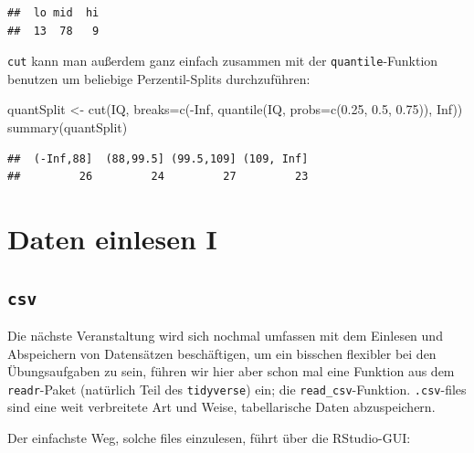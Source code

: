\documentclass[
]{book}
\newenvironment{Shaded}{\begin{snugshade}}{\end{snugshade}}
\newcommand{\AttributeTok}[1]{\textcolor[rgb]{0.77,0.63,0.00}{#1}}
\newcommand{\ConstantTok}[1]{\textcolor[rgb]{0.00,0.00,0.00}{#1}}
\newcommand{\FloatTok}[1]{\textcolor[rgb]{0.00,0.00,0.81}{#1}}
\newcommand{\FunctionTok}[1]{\textcolor[rgb]{0.00,0.00,0.00}{#1}}
\newcommand{\NormalTok}[1]{#1}
\newcommand{\OtherTok}[1]{\textcolor[rgb]{0.56,0.35,0.01}{#1}}
\newcommand{\SpecialCharTok}[1]{\textcolor[rgb]{0.00,0.00,0.00}{#1}}
\begin{document}
\begin{verbatim}
##  lo mid  hi 
##  13  78   9
\end{verbatim}

\texttt{cut} kann man außerdem ganz einfach zusammen mit der \texttt{quantile}-Funktion benutzen um beliebige Perzentil-Splits durchzuführen:

\begin{Shaded}
\begin{Highlighting}[]
\NormalTok{quantSplit }\OtherTok{\textless{}{-}} \FunctionTok{cut}\NormalTok{(IQ,}
                  \AttributeTok{breaks=}\FunctionTok{c}\NormalTok{(}\SpecialCharTok{{-}}\ConstantTok{Inf}\NormalTok{, }
                           \FunctionTok{quantile}\NormalTok{(IQ, }
                                    \AttributeTok{probs=}\FunctionTok{c}\NormalTok{(}\FloatTok{0.25}\NormalTok{,}
                                            \FloatTok{0.5}\NormalTok{, }
                                            \FloatTok{0.75}\NormalTok{)), }
                           \ConstantTok{Inf}\NormalTok{))}
\FunctionTok{summary}\NormalTok{(quantSplit)}
\end{Highlighting}
\end{Shaded}

\begin{verbatim}
##  (-Inf,88]  (88,99.5] (99.5,109] (109, Inf] 
##         26         24         27         23
\end{verbatim}

\hypertarget{daten-einlesen-i}{%
\section{Daten einlesen I}\label{daten-einlesen-i}}

\hypertarget{csv}{%
\subsection{\texorpdfstring{\texttt{csv}}{csv}}\label{csv}}

Die nächste Veranstaltung wird sich nochmal umfassen mit dem Einlesen und Abspeichern von Datensätzen beschäftigen, um ein bisschen flexibler bei den Übungsaufgaben zu sein, führen wir hier aber schon mal eine Funktion aus dem \texttt{readr}-Paket (natürlich Teil des \texttt{tidyverse}) ein; die \texttt{read\_csv}-Funktion. \texttt{.csv}-files sind eine weit verbreitete Art und Weise, tabellarische Daten abzuspeichern.

Der einfachste Weg, solche files einzulesen, führt über die RStudio-GUI:
\end{document}
